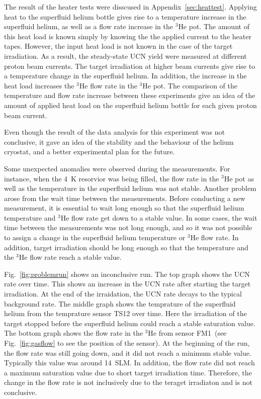 The result of the heater tests were disscused in
Appendix~\ref{sec:heattest}. Applying heat to the superfluid helium
bottle gives rise to a temperature increase in the superfluid helium,
as well as a flow rate increase in the $^3$He pot. The amount of this
heat load is known simply by knowing the the applied current to the
heater tapes. However, the input heat load is not known in the case of
the target irradiation. As a result, the steady-state UCN yield were
measured at different proton beam currents. The target irradiation at
higher beam currents give rise to a temperature change in the
superfluid helium. In addition, the increase in the heat load
increases the $^3$He flow rate in the $^3$He pot.  The comparison of
the temperature and flow rate increase between these experiments give
an idea of the amount of applied heat load on the superfluid helium
bottle for each given proton beam current.

Even though the result of the data analysis for this experiment was
not conclusive, it gave an idea of the stability and the behaviour of
the helium cryostat, and a better experimental plan for the future.

Some unexpected anomalies were observed during the measurements. For
instance, when the 4~K resorvior was being filled, the flow rate in
the $^3$He pot as well as the temperature in the superfluid helium was
not stable. Another problem arose from the wait time between the
measurements. Before conducting a new measurement, it is essential to
wait long enough so that the superfluid helium temperature and $^3$He
flow rate get down to a stable value. In some cases, the wait time
between the measurements was not long enough, and so it was not
possible to assign a change in the superfluid helium temperature or
$^3$He flow rate. In addition, target irradiation should be long
enough so that the temperature and the $^3$He flow rate reach a stable
value.

Fig.~\ref{fig:problemrun} shows an inconclusive run. The top graph
shows the UCN rate over time. This shows an increase in the UCN rate
after starting the target irradiation. At the end of the irraidation,
the UCN rate decays to the typical background rate. The middle graph
shows the temprature of the superfluid helium from the temprature
sensor TS12 over time. Here the irradiation of the target stopped
before the superfluid helium could reach a stable saturation
value. The bottom graph shows the flow rate in the $^3$He from sensor
FM1~(see Fig.~\ref{fig:gasflow} to see the position of the sensor). At
the beginning of the run, the flow rate was still going down, and it
did not reach a minimum stable value. Typically this value was around
14~SLM. In addition, the flow rate did not reach a maximum saturation
value due to short target irradiation time. Therefore, the change in
the flow rate is not inclusively due to the teraget irradiaton and is
not conclusive.



